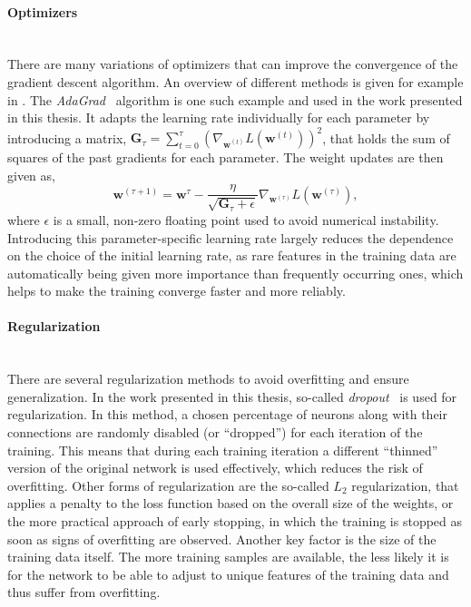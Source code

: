 \paragraph{Optimizers}\mbox{}\\
There are many variations of optimizers that can improve the convergence of the gradient descent algorithm. An overview of different methods is given for example in . The \emph{AdaGrad}~\cite{adagrad-duchi} algorithm is one such example and used in the work presented in this thesis. It adapts the learning rate individually for each parameter by introducing a matrix, $\pmb{G}_{\tau} = \sum_{t=0}^{\tau} \left( \nabla_{\pmb{w}^{(t)}} L(\pmb{w}^{(t)}) \right)^2$, that holds the sum of squares of the past gradients for each parameter. 
The weight updates are then given as,
\begin{equation}
    \pmb{w}^{(\tau+1)} = \pmb{w}^\tau - \frac{\eta}{\sqrt{\pmb{G}_\tau + \epsilon}}  \nabla_{\pmb{w}^{(\tau)}} L(\pmb{w}^{(\tau)}), 
\end{equation}
where $\epsilon$ is a small, non-zero floating point used to avoid numerical instability.
Introducing this parameter-specific learning rate largely reduces the dependence on the choice of the initial learning rate, as rare features in the training data are automatically being given more importance than frequently occurring ones, which helps to make the training converge faster and more reliably.


\paragraph{Regularization}\mbox{}\\
There are several regularization methods to avoid overfitting and ensure generalization. 
In the work presented in this thesis, so-called \emph{dropout}~\cite{srivastava_dropout_2014,DBLP:journals/corr/abs-1207-0580} is used for regularization. In this method, a chosen percentage of neurons along with their connections are randomly disabled (or ``dropped'') for each iteration of the training. This means that during each training iteration a different ``thinned'' version of the original network is used effectively, which reduces the risk of overfitting. 
Other forms of regularization are the so-called $L_2$ regularization, that applies a penalty to the loss function based on the overall size of the weights, or the more practical approach of early stopping, in which the training is stopped as soon as signs of overfitting are observed. 
Another key factor is the size of the training data itself. The more training samples are available, the less likely it is for the network to be able to adjust to unique features of the training data and thus suffer from overfitting.


